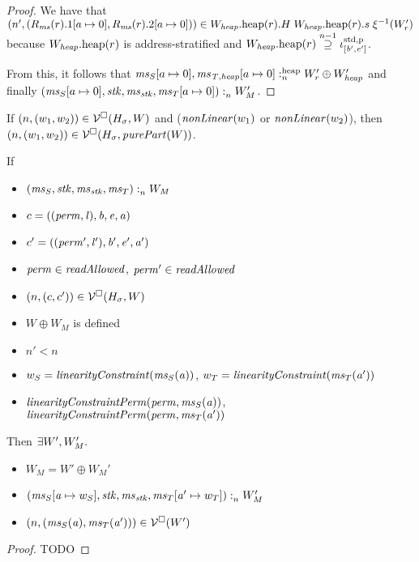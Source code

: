 \documentclass[a4paper]{article}
\begin{document}
\begin{proof}
  We have that $\npair[n']{(R_\ms(r).1\update{a}{0},R_\ms(r).2\update{a}{0})} \in \pwheap[W_\var{heap}](r).H \;
  \pwheap[W_\var{heap}](r).s \; \xi^{-1}(W_r')$ because $\pwheap[W_\var{heap}](r)$ is address-stratified and $\pwheap[W_\var{heap}](r) \nsupeq[n-1] \stdreg{[\baddr',\eaddr']}{\pur}$.

  From this, it follows that $\memSatHeap{\ms_S\update{a}{0},\ms_\var{T,heap}\update{a}{0}}{W_r' \oplus W_\var{heap}'}$ and finally $\memSat{(\ms_S\update{a}{0},\stk,\ms_\stk,\ms_T\update{a}{0})}{W_M'}$.
\end{proof}

\begin{lemma}
  \label{lem:non-linear-pure}
  If $\npair{(w_1,w_2)} \in \lrv(H_\sigma,W)$ and ($\nonLinear{w_1}$ or $\nonLinear{w_2}$), then
  $\npair{(w_1,w_2)} \in \lrv(H_\sigma,\purePart{W})$.
\end{lemma}

\begin{lemma}
  \label{lem:readcond-cap-works}
  If
  \begin{itemize}
  \item $\memSat{(\ms_S,\stk,\ms_\stk,\ms_T)}{W_M}$
  \item $c = ((\perm,\lin),\baddr,\eaddr,\aaddr)$
  \item $c' = ((\perm',\lin'),\baddr',\eaddr',\aaddr')$
  \item $\perm \in \readAllowed{}$, $\perm' \in \readAllowed{}$
  \item $\npair{(c,c')}\in\lrv(H_\sigma,W)$
  \item $W \oplus W_M$ is defined
  \item $n' < n$
  \item $w_S = \linCons{\ms_S(\aaddr)}$, $w_T = \linCons{\ms_T(\aaddr')}$
  \item $\linConsPerm{\perm}{\ms_S(\aaddr)}$, $\linConsPerm{\perm}{\ms_T(\aaddr')}$
  \end{itemize}
  Then $\exists W', W_M'\ldotp$
  \begin{itemize}
  \item $W_M = W' \oplus W_M'$
  \item $\memSat{(\ms_S\update{\aaddr}{w_S},\stk,\ms_\stk,\ms_T\update{\aaddr'}{w_T})}{W_M'}$
  \item $\npair{(\ms_S(\aaddr),\ms_T(\aaddr'))} \in \lrv(W')$
  \end{itemize}
\end{lemma}
\begin{proof}
  TODO
\end{proof}
\end{document}
